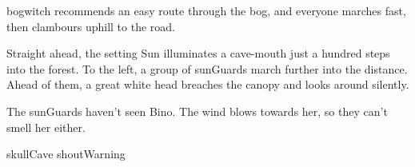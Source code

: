 \Gls{bogwitch} recommends an easy route through the bog, and everyone marches fast, then clambours uphill to the road.


Straight ahead, the setting Sun illuminates a cave-mouth just a hundred \glspl{step} into the forest.
To the left, a group of \glspl{sunGuard} march further into the distance.
Ahead of them, a great white head breaches the canopy and looks around silently.

The \glspl{sunGuard} haven't seen Bino.
The wind blows towards her, so they can't smell her either.

\begin{selectPath}
  {}%
  {skullCave}
  {}%
  {shoutWarning}
\end{selectPath}

